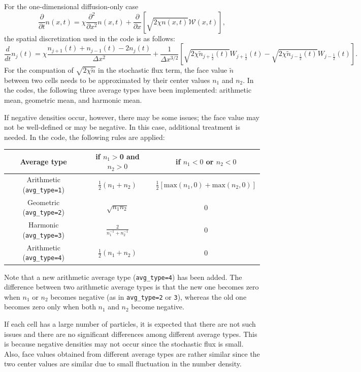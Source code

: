 \documentclass{article}
\begin{document}
For the one-dimensional diffusion-only case
\begin{equation}
\frac{\partial}{\partial t}n(x,t)=\chi\frac{\partial^2}{\partial x^2}n(x,t)+\frac{\partial}{\partial x}\left[\sqrt{2\chi n(x,t)} \bm{\mathcal{W}}(x,t)\right],
\end{equation}
the spatial discretization used in the code is as follows:
\begin{equation}
\frac{d}{dt}n_j(t) = \chi \frac{n_{j+1}(t)+n_{j-1}(t)-2n_j(t)}{\Delta x^2}
+\frac{1}{\Delta x^{3/2}}\left[
\sqrt{2\chi\tilde{n}_{j+\frac12}(t)} W_{j+\frac12}(t)
-\sqrt{2\chi\tilde{n}_{j-\frac12}(t)} W_{j-\frac12}(t)
\right].
\end{equation}
For the compuation of $\sqrt{2\chi \tilde{n}}$ in the stochastic flux term, the face value $\tilde{n}$ between two cells needs to be approximated by their center values $n_1$ and $n_2$.
In the codes, the following three average types have been implemented: arithmetic mean, geometric mean, and harmonic mean.

If negative densities occur, however, there may be some issues; the face value may not be well-defined or may be negative.
In this case, additional treatment is needed.
In the code, the following rules are applied:
\begin{center}
{\tabulinesep=1.2mm
\begin{tabu}{|c|c|c|}
\hline
Average type & if $n_1>$0 and $n_2>0$ & if $n_1<0$ or $n_2<0$ \\
\hline
Arithmetic (\texttt{avg\_type=1}) & $\frac{1}{2}(n_1+n_2)$ & $\frac{1}{2}\left[\mathrm{max}(n_1,0)+\mathrm{max}(n_2,0)\right]$ \\
\hline
Geometric (\texttt{avg\_type=2}) & $\sqrt{n_1 n_2}$ & 0 \\
\hline
Harmonic (\texttt{avg\_type=3}) & $\frac{2}{n_1^{-1}+n_2^{-1}}$ & 0 \\
\hline
Arithmetic (\texttt{avg\_type=4}) & $\frac{1}{2}(n_1+n_2)$ & 0 \\
\hline
\end{tabu}
}
\end{center}
Note that a new arithmetic average type (\texttt{avg\_type=4}) has been added.
The difference between two arithmetic average types is that the new one becomes zero when $n_1$ or $n_2$ becomes negative (as in \texttt{avg\_type=2} or \texttt{3}), whereas the old one becomes zero only when both $n_1$ and $n_2$ become negative.

If each cell has a large number of particles, it is expected that there are not such issues and there are no significant differences among different average types.
This is because negative densities may not occur since the stochastic flux is small.
Also, face values obtained from different average types are rather similar since the two center values are similar due to small fluctuation in the number density.
\end{document}
